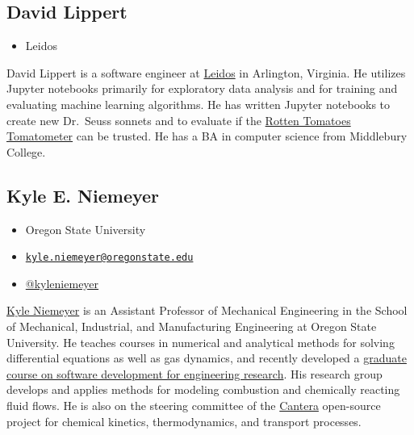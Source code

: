 \documentclass[]{book}
\providecommand{\tightlist}{%
  \setlength{\itemsep}{0pt}\setlength{\parskip}{0pt}}
\begin{document}
\subsection*{David Lippert}\label{david-lippert}

\begin{itemize}
\tightlist
\item
  Leidos
\end{itemize}

David Lippert is a software engineer at
\href{https://www.leidos.com}{Leidos} in Arlington, Virginia. He
utilizes Jupyter notebooks primarily for exploratory data analysis and
for training and evaluating machine learning algorithms. He has written
Jupyter notebooks to create new Dr.~Seuss sonnets and to evaluate if the
\href{https://www.rottentomatoes.com/about}{Rotten Tomatoes Tomatometer}
can be trusted. He has a BA in computer science from Middlebury College.

\subsection*{Kyle E. Niemeyer}\label{kyle-e.-niemeyer}

\begin{itemize}
\tightlist
\item
  Oregon State University
\item
  \href{mailto:kyle.niemeyer@oregonstate.edu}{\nolinkurl{kyle.niemeyer@oregonstate.edu}}
\item
  \href{https://twitter.com/kyleniemeyer}{@kyleniemeyer}
\end{itemize}

\href{https://niemeyer-research-group.github.io/}{Kyle Niemeyer} is an
Assistant Professor of Mechanical Engineering in the School of
Mechanical, Industrial, and Manufacturing Engineering at Oregon State
University. He teaches courses in numerical and analytical methods for
solving differential equations as well as gas dynamics, and recently
developed a
\href{https://softwaredevengresearch.github.io/syllabus/}{graduate
course on software development for engineering research}. His research
group develops and applies methods for modeling combustion and
chemically reacting fluid flows. He is also on the steering committee of
the \href{https://cantera.org/}{Cantera} open-source project for
chemical kinetics, thermodynamics, and transport processes.
\end{document}
